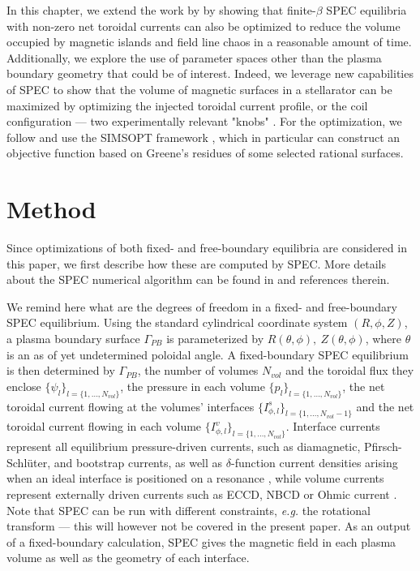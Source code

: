 \documentclass[my_thesis.tex]{subfiles}
\begin{document}
In this chapter, we extend the work by \citet{Landreman2021a} by showing that finite-$\beta$ \ac{SPEC} equilibria with non-zero net toroidal currents can also be optimized to reduce the volume occupied by magnetic islands and field line chaos in a reasonable amount of time. Additionally, we explore the use of parameter spaces other than the plasma boundary geometry that could be of interest. Indeed, we leverage new capabilities of \ac{SPEC} to show that the volume of magnetic surfaces in a stellarator can be maximized by optimizing the injected toroidal current profile, or the coil configuration --- two experimentally relevant "knobs" \cite{Geiger2015}. For the optimization, we follow \citet{Landreman2021a} and use the SIMSOPT framework \cite{Landreman2021b}, which in particular can construct an objective function based on Greene's residues \cite{Greene1978} of some selected rational surfaces. 



\section{\label{sec:method}Method}

Since optimizations of both fixed- and free-boundary equilibria are considered in this paper, we first describe how these are computed by \ac{SPEC}. More details about the \ac{SPEC} numerical algorithm can be found in \citet{Hudson2012,Hudson2020c} and references therein.

We remind here what are the degrees of freedom in a fixed- and free-boundary SPEC equilibrium. Using the standard cylindrical coordinate system $(R,\phi,Z)$, a plasma boundary surface $\Gamma_{PB}$ is parameterized by $R(\theta,\phi),\ Z(\theta,\phi)$, where $\theta$ is an as of yet undetermined poloidal angle. A fixed-boundary \ac{SPEC} equilibrium is then determined by $\Gamma_{PB}$, the number of volumes $N_{vol}$ and the toroidal flux they enclose $\{\psi_{l}\}_{l=\{1,\ldots,N_{vol}\}}$, the pressure in each volume $\{p_l\}_{l=\{1,\ldots,N_{vol}\}}$, the net toroidal  current flowing at the volumes' interfaces $\{I^s_{\phi,l}\}_{l=\{1,\ldots,N_{vol}-1\}}$ and the net toroidal current flowing in each volume $\{I^v_{\phi,l}\}_{l=\{1,\ldots,N_{vol}\}}$.
Interface currents represent all equilibrium pressure-driven currents, such as diamagnetic, Pfirsch-Schl\"uter, and bootstrap currents, as well as $\delta$-function current densities arising when an ideal interface is positioned on a resonance \citep{Loizu2015}, while volume currents represent externally driven currents such as \ac{ECCD}, \ac{NBCD} or Ohmic current \citep{Baillod2021}. Note that \ac{SPEC} can be run with different constraints, \textit{e.g.} the rotational transform --- this will  however not be covered in the present paper. As an output of a fixed-boundary calculation, \ac{SPEC} gives the magnetic field in each plasma volume as well as the geometry of each interface.
\end{document}
